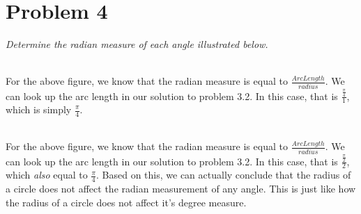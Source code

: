 \documentclass[11pt]{article} %
\begin{document}
\section{Problem 4}
\textit{Determine the radian measure of each angle illustrated below.} \\
\\
For the above figure, we know that the radian measure is equal to $\frac{Arc Length}{radius}$. 
We can look up the arc length in our solution to problem 3.2.
In this case, that is $\frac{\frac{\pi}{4}}{1}$, which is simply \textbf{$\frac{\pi}{4}$}.
\\
\\
For the above figure, we know that the radian measure is equal to $\frac{Arc Length}{radius}$. 
We can look up the arc length in our solution to problem 3.2.
In this case, that is $\frac{\frac{\pi}{2}}{2}$, which \textit{also} equal to \textbf{$\frac{\pi}{4}$}.
Based on this, we can actually conclude that the radius of a circle does not affect the radian measurement of any angle. 
This is just like how the radius of a circle does not affect it's degree measure.
\end{document}
